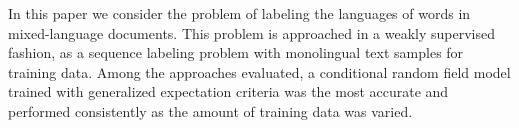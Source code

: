 In this paper we consider the problem of labeling the languages of words in mixed-language documents. This problem is approached in a weakly supervised
 fashion, as a sequence labeling problem with monolingual text samples for
 training data. Among the  approaches evaluated, a conditional random field
 model trained with generalized expectation criteria was the most accurate and
 performed consistently as the amount of training data was varied.

